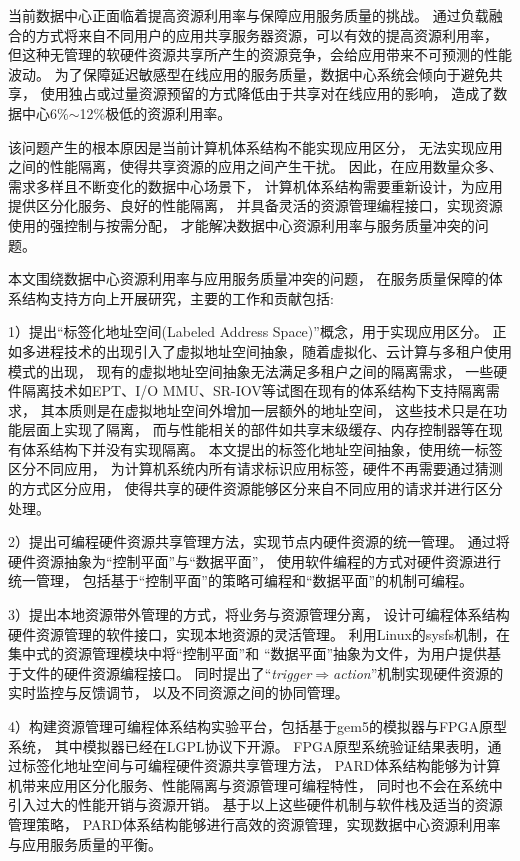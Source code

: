 \begin{cabstract}
  当前数据中心正面临着提高资源利用率与保障应用服务质量的挑战。
  通过负载融合的方式将来自不同用户的应用共享服务器资源，可以有效的提高资源利用率，
  但这种无管理的软硬件资源共享所产生的资源竞争，会给应用带来不可预测的性能波动。
  为了保障延迟敏感型在线应用的服务质量，数据中心系统会倾向于避免共享，
  使用独占或过量资源预留的方式降低由于共享对在线应用的影响，
  造成了数据中心6\%$\sim$12\%极低的资源利用率。

  该问题产生的根本原因是当前计算机体系结构不能实现应用区分，
  无法实现应用之间的性能隔离，使得共享资源的应用之间产生干扰。
  因此，在应用数量众多、需求多样且不断变化的数据中心场景下，
  计算机体系结构需要重新设计，为应用提供区分化服务、良好的性能隔离，
  并具备灵活的资源管理编程接口，实现资源使用的强控制与按需分配，
  才能解决数据中心资源利用率与服务质量冲突的问题。

  本文围绕数据中心资源利用率与应用服务质量冲突的问题，
  在服务质量保障的体系结构支持方向上开展研究，主要的工作和贡献包括:

  1）提出``标签化地址空间(Labeled Address Space)''概念，用于实现应用区分。
     正如多进程技术的出现引入了虚拟地址空间抽象，随着虚拟化、云计算与多租户使用模式的出现，
     现有的虚拟地址空间抽象无法满足多租户之间的隔离需求，
     一些硬件隔离技术如EPT、I/O MMU、SR-IOV等试图在现有的体系结构下支持隔离需求，
     其本质则是在虚拟地址空间外增加一层额外的地址空间，
     这些技术只是在功能层面上实现了隔离，
     而与性能相关的部件如共享末级缓存、内存控制器等在现有体系结构下并没有实现隔离。
     本文提出的标签化地址空间抽象，使用统一标签区分不同应用，
     为计算机系统内所有请求标识应用标签，硬件不再需要通过猜测的方式区分应用，
     使得共享的硬件资源能够区分来自不同应用的请求并进行区分处理。

  2）提出可编程硬件资源共享管理方法，实现节点内硬件资源的统一管理。
     通过将硬件资源抽象为``控制平面''与``数据平面''，
     使用软件编程的方式对硬件资源进行统一管理，
     包括基于``控制平面''的策略可编程和``数据平面''的机制可编程。

  3）提出本地资源带外管理的方式，将业务与资源管理分离，
     设计可编程体系结构硬件资源管理的软件接口，实现本地资源的灵活管理。
     利用Linux的sysfs机制，在集中式的资源管理模块中将``控制平面''和
     ``数据平面''抽象为文件，为用户提供基于文件的硬件资源编程接口。
     同时提出了``\emph{trigger$\Rightarrow$action}''机制实现硬件资源的实时监控与反馈调节，
     以及不同资源之间的协同管理。

  4）构建资源管理可编程体系结构实验平台，包括基于gem5的模拟器与FPGA原型系统，
     其中模拟器已经在LGPL协议下开源。
     FPGA原型系统验证结果表明，通过标签化地址空间与可编程硬件资源共享管理方法，
     PARD体系结构能够为计算机带来应用区分化服务、性能隔离与资源管理可编程特性，
     同时也不会在系统中引入过大的性能开销与资源开销。
     基于以上这些硬件机制与软件栈及适当的资源管理策略，
     PARD体系结构能够进行高效的资源管理，实现数据中心资源利用率与应用服务质量的平衡。
\end{cabstract}

